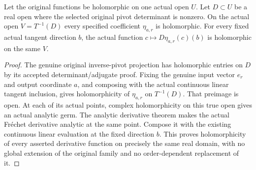 \begin{theorem}
\label{hir:actual-centre-projected-dual-row-first-derivatives-holomorphic}
\leanok
Let the original functions be holomorphic on one actual open $U$.
Let $D\subset U$ be a real open where the selected original pivot
determinant is nonzero. On the actual open $V=T^{-1}(D)$ every
specified coefficient $\eta_{a,r}$ is holomorphic. For every fixed
actual tangent direction $b$, the actual function
$c\mapsto D\eta_{a,r}(c)(b)$ is holomorphic on the same $V$.
\end{theorem}
\begin{proof}
The genuine original inverse-pivot projection has holomorphic entries
on $D$ by its accepted determinant/adjugate proof. Fixing the genuine
input vector $e_r$ and output coordinate $a$, and composing with the
actual continuous linear tangent inclusion, gives holomorphicity of
$\eta_{a,r}$ on $T^{-1}(D)$. That preimage is open. At each of its
actual points, complex holomorphicity on this true open gives an
actual analytic germ. The analytic derivative theorem makes the
actual Fr\'echet derivative analytic at the same point. Compose it
with the existing continuous linear evaluation at the fixed direction
$b$. This proves holomorphicity of every asserted derivative function
on precisely the same real domain, with no global extension of the
original family and no order-dependent replacement of it.
\end{proof}

